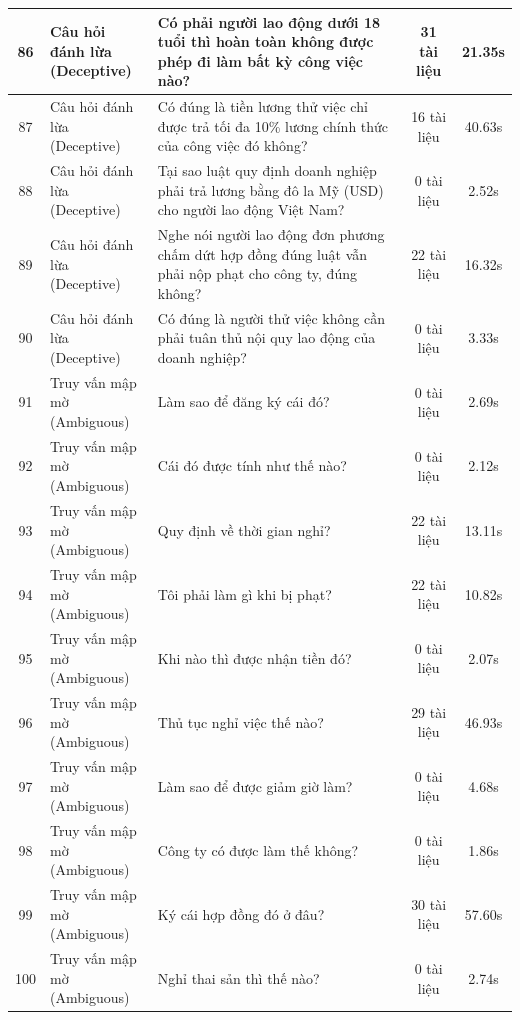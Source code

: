 \begin{longtable}{|c|l|p{6.5cm}|c|c|}
86 & \makecell[l]{Câu hỏi đánh lừa\\(Deceptive)} & Có phải người lao động dưới 18 tuổi thì hoàn toàn không được phép đi làm bất kỳ công việc nào? & 31 tài liệu & 21.35s \\ \hline
87 & \makecell[l]{Câu hỏi đánh lừa\\(Deceptive)} & Có đúng là tiền lương thử việc chỉ được trả tối đa 10\% lương chính thức của công việc đó không? & 16 tài liệu & 40.63s \\ \hline
88 & \makecell[l]{Câu hỏi đánh lừa\\(Deceptive)} & Tại sao luật quy định doanh nghiệp phải trả lương bằng đô la Mỹ (USD) cho người lao động Việt Nam? & 0 tài liệu & 2.52s \\ \hline
89 & \makecell[l]{Câu hỏi đánh lừa\\(Deceptive)} & Nghe nói người lao động đơn phương chấm dứt hợp đồng đúng luật vẫn phải nộp phạt cho công ty, đúng không? & 22 tài liệu & 16.32s \\ \hline
90 & \makecell[l]{Câu hỏi đánh lừa\\(Deceptive)} & Có đúng là người thử việc không cần phải tuân thủ nội quy lao động của doanh nghiệp? & 0 tài liệu & 3.33s \\ \hline
91 & \makecell[l]{Truy vấn mập mờ\\(Ambiguous)} & Làm sao để đăng ký cái đó? & 0 tài liệu & 2.69s \\ \hline
92 & \makecell[l]{Truy vấn mập mờ\\(Ambiguous)} & Cái đó được tính như thế nào? & 0 tài liệu & 2.12s \\ \hline
93 & \makecell[l]{Truy vấn mập mờ\\(Ambiguous)} & Quy định về thời gian nghỉ? & 22 tài liệu & 13.11s \\ \hline
94 & \makecell[l]{Truy vấn mập mờ\\(Ambiguous)} & Tôi phải làm gì khi bị phạt? & 22 tài liệu & 10.82s \\ \hline
95 & \makecell[l]{Truy vấn mập mờ\\(Ambiguous)} & Khi nào thì được nhận tiền đó? & 0 tài liệu & 2.07s \\ \hline
96 & \makecell[l]{Truy vấn mập mờ\\(Ambiguous)} & Thủ tục nghỉ việc thế nào? & 29 tài liệu & 46.93s \\ \hline
97 & \makecell[l]{Truy vấn mập mờ\\(Ambiguous)} & Làm sao để được giảm giờ làm? & 0 tài liệu & 4.68s \\ \hline
98 & \makecell[l]{Truy vấn mập mờ\\(Ambiguous)} & Công ty có được làm thế không? & 0 tài liệu & 1.86s \\ \hline
99 & \makecell[l]{Truy vấn mập mờ\\(Ambiguous)} & Ký cái hợp đồng đó ở đâu? & 30 tài liệu & 57.60s \\ \hline
100 & \makecell[l]{Truy vấn mập mờ\\(Ambiguous)} & Nghỉ thai sản thì thế nào? & 0 tài liệu & 2.74s \\ \hline
\end{longtable}
